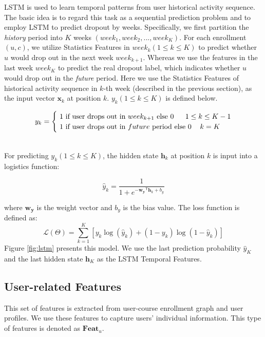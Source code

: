 LSTM is used to learn temporal patterns from user historical activity sequence. The basic idea is to regard this task as a sequential prediction problem and to employ LSTM to predict dropout by weeks.
Specifically, we first partition the \emph{history} period into $K$ weeks $(week_1,week_2,..., week_K)$. For each enrollment $(u,c)$, we utilize Statistics Features in $week_k(1 \le k \le K)$ to predict whether $u$ would drop out in the next week $week_{k+1}$. Whereas we use the features in the last week $week_K$ to predict the real dropout label, which indicates whether $u$ would drop out in the \emph{future} period. Here we use the Statistics Features of historical activity sequence in $k$-th week (described in the previous section), as the input vector $\mathbf{x}_k$ at position $k$. $y_k(1 \le k \le K)$ is defined below.\\
\begin{small}
$$y_k = 
	\begin{cases}
	\text{ 1 if user drops out in  } week_{k+1} \text{ else 0} & \makebox[45pt][r]{$1 \le k \le K-1$} \\
	\text{ 1 if user drops out in }  future \text{ period else 0} & \makebox[30pt][r]{$k=K$}
	\end{cases}
$$
\end{small}
\\
 For predicting $y_k(1 \le k \le K)$, the hidden state $\mathbf{h}_k$ at position $k$ is input into a logistics function:
 
\begin{equation}
\hat{y}_k=\frac{1}{1+e^{-\mathbf{w_y}^\mathsf{T} \mathbf{h}_k+b_y}}
 \end{equation}

\noindent where $\mathbf{w_y}$ is the weight vector and $b_y$ is the bias value.
The loss function is defined as:
\begin{equation}
\mathcal{L}(\Theta)= \sum_{k=1}^{K}[y_k\log(\hat{y}_k)+(1-y_k)\log(1-\hat{y}_k)]
\end{equation}
Figure \ref{fig:lstm} presents this model. We use the last prediction probability $\hat{y}_K$ and the last hidden state $\mathbf{h}_K$ as the LSTM Temporal Features.
\subsection{User-related Features}
	\label{sec:UFeat}
	This set of features is extracted from user-course enrollment graph and user profiles. We use these features to capture users' individual information. This type of features is denoted as  $\mathbf{Feat}_u$.\\
	
